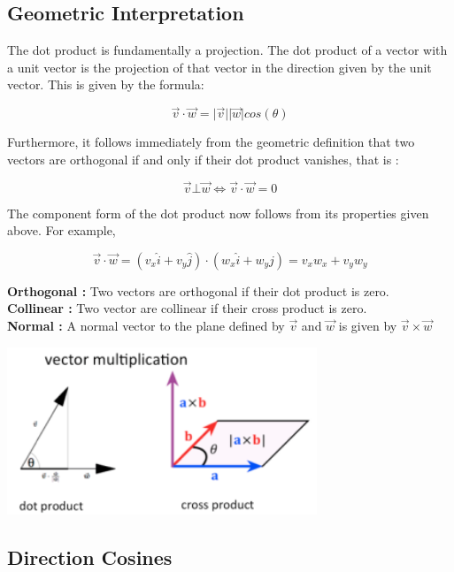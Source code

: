 \documentclass[12pt]{report}
\begin{document}
\subsection{Geometric Interpretation}

The dot product is fundamentally a projection. The dot product of a vector with a unit vector is the projection of that vector in the direction given by the unit vector. This is given by the formula:

\[ \overrightarrow{v} \cdot \overrightarrow{w} = \vert \overrightarrow{v} \vert \vert \overrightarrow{w} \vert  cos (\theta) \]


Furthermore, it follows immediately from the geometric definition that two vectors are orthogonal if and only if their dot product vanishes, that is : 

\[ \overrightarrow{v} \bot \overrightarrow{w} \Leftrightarrow \overrightarrow{v} \cdot \overrightarrow{w} = 0 \]


The component form of the dot product now follows from its properties given above. For example, 

\[ \overrightarrow{v} \cdot \overrightarrow{w} = ( v_{x} \widehat{i} + v_{y} \widehat{j}) \cdot ( w_{x} \widehat{i} + w_{y} \widehat{j}) = v_{x}w_{x} + v_{y}w_{y} \] 

\indent \textbf{Orthogonal : } Two vectors are orthogonal if their dot product is zero.  \\
\indent \textbf{Collinear : } Two vector are collinear if their cross product is zero.  \\
\indent \textbf{Normal : } A normal vector to the plane defined by 
$\overrightarrow{v}  $ and $ \overrightarrow{w}$ is given by  $\overrightarrow{v} \times \overrightarrow{w}  $
\\

\begin{center}
  \includegraphics[height=5cm]{gibbsvectorsdotcross.png}
\end{center}

\subsection{Direction Cosines}
\end{document}
